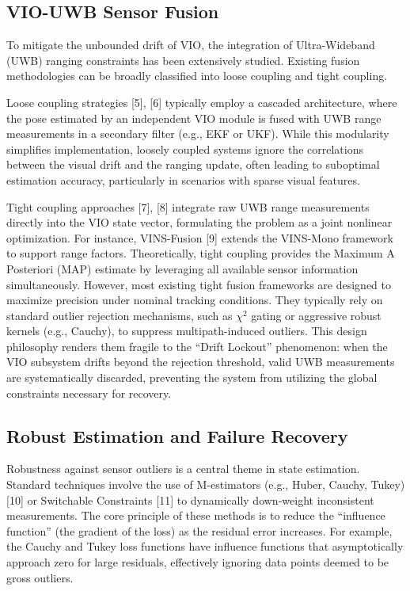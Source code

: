 \documentclass[conference]{IEEEtran}
\begin{document}
\subsection{VIO-UWB Sensor Fusion}
To mitigate the unbounded drift of VIO, the integration of Ultra-Wideband (UWB) ranging constraints has been extensively studied. Existing fusion methodologies can be broadly classified into loose coupling and tight coupling.

Loose coupling strategies [5], [6] typically employ a cascaded architecture, where the pose estimated by an independent VIO module is fused with UWB range measurements in a secondary filter (e.g., EKF or UKF). While this modularity simplifies implementation, loosely coupled systems ignore the correlations between the visual drift and the ranging update, often leading to suboptimal estimation accuracy, particularly in scenarios with sparse visual features.

Tight coupling approaches [7], [8] integrate raw UWB range measurements directly into the VIO state vector, formulating the problem as a joint nonlinear optimization. For instance, VINS-Fusion [9] extends the VINS-Mono framework to support range factors. Theoretically, tight coupling provides the Maximum A Posteriori (MAP) estimate by leveraging all available sensor information simultaneously. However, most existing tight fusion frameworks are designed to maximize precision under nominal tracking conditions. They typically rely on standard outlier rejection mechanisms, such as $\chi^2$ gating or aggressive robust kernels (e.g., Cauchy), to suppress multipath-induced outliers. This design philosophy renders them fragile to the ``Drift Lockout'' phenomenon: when the VIO subsystem drifts beyond the rejection threshold, valid UWB measurements are systematically discarded, preventing the system from utilizing the global constraints necessary for recovery.

\subsection{Robust Estimation and Failure Recovery}
Robustness against sensor outliers is a central theme in state estimation. Standard techniques involve the use of M-estimators (e.g., Huber, Cauchy, Tukey) [10] or Switchable Constraints [11] to dynamically down-weight inconsistent measurements. The core principle of these methods is to reduce the ``influence function'' (the gradient of the loss) as the residual error increases. For example, the Cauchy and Tukey loss functions have influence functions that asymptotically approach zero for large residuals, effectively ignoring data points deemed to be gross outliers.
\end{document}
